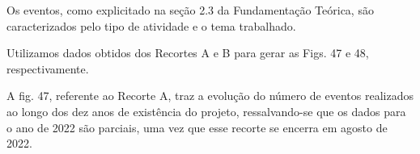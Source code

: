 \documentclass[
12pt,		%
openright,	%
twoside,  %
a4paper,			%
chapter=TITLE,		%
english,			%
french,				%
spanish,			%
brazil				%
]{USPSC-classe/USPSC}
\begin{document}
Os eventos, como explicitado na se\c{c}\~ao 2.3 da Fundamenta\c{c}\~ao Te\'orica, s\~ao caracterizados pelo tipo de atividade e o tema trabalhado.








Utilizamos dados obtidos dos Recortes A e B para gerar as Figs. 47 e 48, respectivamente.








A fig. 47, referente ao Recorte A, traz a evolu\c{c}\~ao do n\'umero de eventos realizados ao longo dos dez anos de exist\^encia do projeto, ressalvando-se que os dados para o ano de 2022 s\~ao parciais, uma vez que esse recorte se encerra em agosto de 2022.
\end{document}
